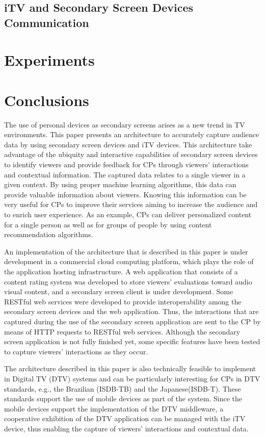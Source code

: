 \documentclass[journal]{IEEEtran}
\begin{document}
\subsection{iTV and Secondary Screen Devices Communication}

\section{Experiments}

\section{Conclusions}

The use of personal devices as secondary screens arises as a new trend in TV environments. This paper presents an architecture to accurately capture audience data by using secondary screen devices and iTV devices. This architecture take advantage of the ubiquity and interactive capabilities of secondary screen devices to identify viewers and provide feedback for CPs through viewers' interactions and contextual information. The captured data relates to a single viewer in a given context. By using proper machine learning algorithms, this data can provide valuable information about viewers. Knowing this information can be very useful for CPs to improve their services aiming to increase the audience and to enrich user experience. As an example, CPs can deliver personalized content for a single person as well as for groups of people by using content recommendation algorithms.

An implementation of the architecture that is described in this paper is under development in a commercial cloud computing platform, which plays the role of the application hosting infrastructure. A web application that consists of a content rating system was developed to store  viewers' evaluations toward audio visual content, and a secondary screen client is under development. Some RESTful web services were developed to provide interoperability among the secondary screen devices and the web application. Thus, the interactions that are captured during the use of the secondary screen application are sent to the CP by means of HTTP requests to RESTful web services. Although the secondary screen application is not fully finished yet, some specific features have been tested to capture viewers' interactions as they occur.

The architecture described in this paper is also technically feasible to implement in Digital TV (DTV) systems and can be particularly interesting for CPs in DTV standards, e.g., the Brazilian (ISDB-TB) and the Japanese(ISDB-T). These standards support the use of mobile devices as part of the system. Since the mobile devices support the implementation of the DTV middleware, a cooperative exhibition of the DTV application can be managed with the iTV device, thus enabling the capture of viewers' interactions and contextual data.



\end{document}
